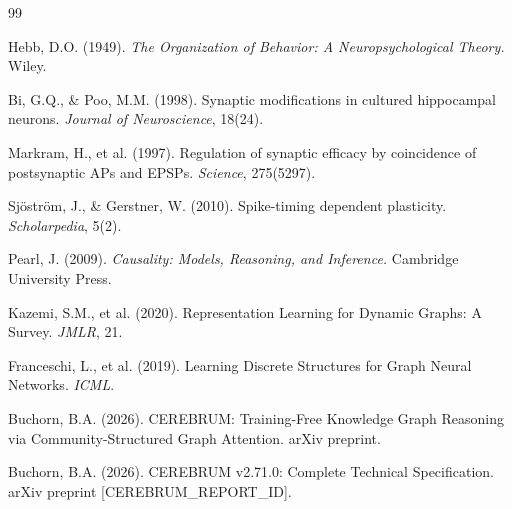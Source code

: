 \documentclass[10pt,twocolumn]{article}
\begin{document}

\begin{thebibliography}{99}

Hebb, D.O. (1949).
\emph{The Organization of Behavior: A Neuropsychological Theory.}
Wiley.

Bi, G.Q., \& Poo, M.M. (1998).
Synaptic modifications in cultured hippocampal neurons.
\emph{Journal of Neuroscience}, 18(24).

Markram, H., et al. (1997).
Regulation of synaptic efficacy by coincidence of postsynaptic APs and EPSPs.
\emph{Science}, 275(5297).

Sjöström, J., \& Gerstner, W. (2010).
Spike-timing dependent plasticity.
\emph{Scholarpedia}, 5(2).

Pearl, J. (2009).
\emph{Causality: Models, Reasoning, and Inference.}
Cambridge University Press.

Kazemi, S.M., et al. (2020).
Representation Learning for Dynamic Graphs: A Survey.
\emph{JMLR}, 21.

Franceschi, L., et al. (2019).
Learning Discrete Structures for Graph Neural Networks.
\emph{ICML}.

Buchorn, B.A. (2026).
CEREBRUM: Training-Free Knowledge Graph Reasoning via Community-Structured Graph Attention.
arXiv preprint.

Buchorn, B.A. (2026).
CEREBRUM v2.71.0: Complete Technical Specification.
arXiv preprint [CEREBRUM\_REPORT\_ID].

\end{thebibliography}
\end{document}
